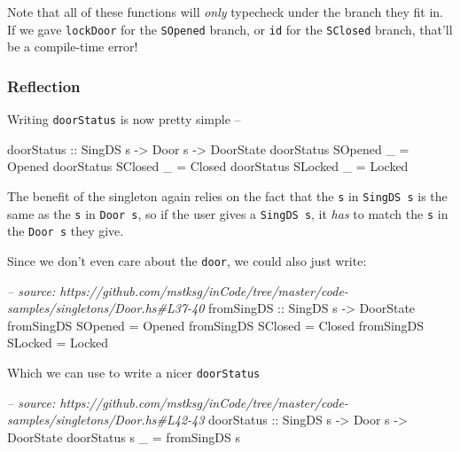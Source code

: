 \documentclass[]{article}
\newenvironment{Shaded}{\begin{snugshade}}{\end{snugshade}}
\newcommand{\CommentTok}[1]{\textcolor[rgb]{0.56,0.35,0.01}{\textit{#1}}}
\newcommand{\DataTypeTok}[1]{\textcolor[rgb]{0.13,0.29,0.53}{#1}}
\newcommand{\FunctionTok}[1]{\textcolor[rgb]{0.00,0.00,0.00}{#1}}
\newcommand{\NormalTok}[1]{#1}
\newcommand{\OtherTok}[1]{\textcolor[rgb]{0.56,0.35,0.01}{#1}}
\begin{document}
Note that all of these functions will \emph{only} typecheck under the branch
they fit in. If we gave \texttt{lockDoor} for the \texttt{SOpened} branch, or
\texttt{id} for the \texttt{SClosed} branch, that'll be a compile-time error!

\hypertarget{reflection}{%
\subsubsection{Reflection}\label{reflection}}

Writing \texttt{doorStatus} is now pretty simple --

\begin{Shaded}
\begin{Highlighting}[]
\OtherTok{doorStatus ::} \DataTypeTok{SingDS}\NormalTok{ s }\OtherTok{->} \DataTypeTok{Door}\NormalTok{ s }\OtherTok{->} \DataTypeTok{DoorState}
\NormalTok{doorStatus }\DataTypeTok{SOpened}\NormalTok{ _ }\FunctionTok{=} \DataTypeTok{Opened}
\NormalTok{doorStatus }\DataTypeTok{SClosed}\NormalTok{ _ }\FunctionTok{=} \DataTypeTok{Closed}
\NormalTok{doorStatus }\DataTypeTok{SLocked}\NormalTok{ _ }\FunctionTok{=} \DataTypeTok{Locked}
\end{Highlighting}
\end{Shaded}

The benefit of the singleton again relies on the fact that the \texttt{s} in
\texttt{SingDS\ s} is the same as the \texttt{s} in \texttt{Door\ s}, so if the
user gives a \texttt{SingDS\ s}, it \emph{has} to match the \texttt{s} in the
\texttt{Door\ s} they give.

Since we don't even care about the \texttt{door}, we could also just write:

\begin{Shaded}
\begin{Highlighting}[]
\CommentTok{-- source: https://github.com/mstksg/inCode/tree/master/code-samples/singletons/Door.hs#L37-40}
\OtherTok{fromSingDS ::} \DataTypeTok{SingDS}\NormalTok{ s }\OtherTok{->} \DataTypeTok{DoorState}
\NormalTok{fromSingDS }\DataTypeTok{SOpened} \FunctionTok{=} \DataTypeTok{Opened}
\NormalTok{fromSingDS }\DataTypeTok{SClosed} \FunctionTok{=} \DataTypeTok{Closed}
\NormalTok{fromSingDS }\DataTypeTok{SLocked} \FunctionTok{=} \DataTypeTok{Locked}
\end{Highlighting}
\end{Shaded}

Which we can use to write a nicer \texttt{doorStatus}

\begin{Shaded}
\begin{Highlighting}[]
\CommentTok{-- source: https://github.com/mstksg/inCode/tree/master/code-samples/singletons/Door.hs#L42-43}
\OtherTok{doorStatus ::} \DataTypeTok{SingDS}\NormalTok{ s }\OtherTok{->} \DataTypeTok{Door}\NormalTok{ s }\OtherTok{->} \DataTypeTok{DoorState}
\NormalTok{doorStatus s _ }\FunctionTok{=}\NormalTok{ fromSingDS s}
\end{Highlighting}
\end{Shaded}
\end{document}
